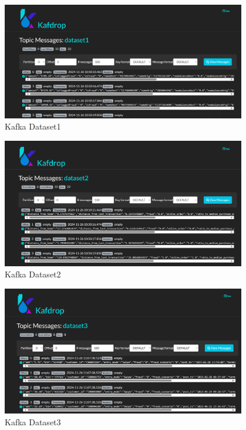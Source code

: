 \documentclass[12pt,a4paper, hidelinks]{article}
\begin{document}
\begin{figure}[htbp]
  \centering
  \includegraphics[width=0.95\textwidth]{images/m2-kafka-1.png}
  \caption{Kafka Dataset1}
  \label{fig:kafka1}
\end{figure}

\begin{figure}[htbp]
  \centering
  \includegraphics[width=0.95\textwidth]{images/m2-kafka-2.png}
  \caption{Kafka Dataset2}
  \label{fig:kafka2}
\end{figure}

\begin{figure}[htbp]
  \centering
  \includegraphics[width=0.95\textwidth]{images/m2-kafka-3.png}
  \caption{Kafka Dataset3}
  \label{fig:kafka3}
\end{figure}
\end{document}
